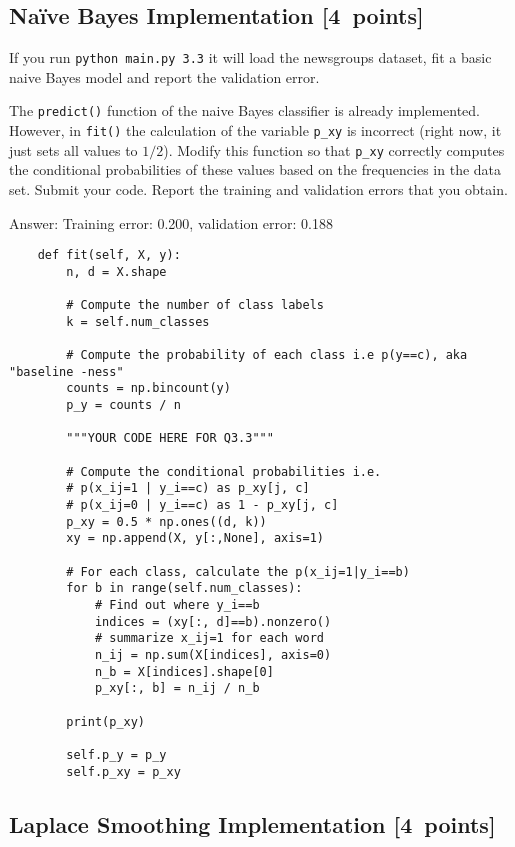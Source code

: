 \documentclass{article}
\newcommand{\blu}[1]{{\textcolor{blu}{#1}}}
\newenvironment{answer}{\par\begingroup\color{gre}Answer: }{\endgroup}
\let\ask\blu
\newcommand\pts[1]{\textcolor{pointscolour}{[#1~points]}}
\begin{document}
    \subsection{Na\"ive Bayes Implementation \pts{4}}

    If you run \texttt{python main.py 3.3}
    it will load the newsgroups dataset, fit a basic naive Bayes model and report the validation error.

    The \texttt{predict()} function of the naive Bayes classifier is already implemented.
    However, in \texttt{fit()}
    the calculation of the variable \texttt{p\_xy} is incorrect
    (right now, it just sets all values to $1/2$).
    \ask{Modify this function so that \texttt{p\_xy} correctly
        computes the conditional probabilities of these values based on the
        frequencies in the data set. Submit your code. Report the training and validation errors that you obtain.}
    \begin{answer}
        Training error: 0.200, validation error: 0.188
        \begin{verbatim}
    def fit(self, X, y):
        n, d = X.shape

        # Compute the number of class labels
        k = self.num_classes

        # Compute the probability of each class i.e p(y==c), aka "baseline -ness"
        counts = np.bincount(y)
        p_y = counts / n

        """YOUR CODE HERE FOR Q3.3"""

        # Compute the conditional probabilities i.e.
        # p(x_ij=1 | y_i==c) as p_xy[j, c]
        # p(x_ij=0 | y_i==c) as 1 - p_xy[j, c]
        p_xy = 0.5 * np.ones((d, k))
        xy = np.append(X, y[:,None], axis=1)

        # For each class, calculate the p(x_ij=1|y_i==b)
        for b in range(self.num_classes):
            # Find out where y_i==b
            indices = (xy[:, d]==b).nonzero()
            # summarize x_ij=1 for each word
            n_ij = np.sum(X[indices], axis=0)
            n_b = X[indices].shape[0]
            p_xy[:, b] = n_ij / n_b

        print(p_xy)

        self.p_y = p_y
        self.p_xy = p_xy
        \end{verbatim}
    \end{answer}
    

    \subsection{Laplace Smoothing Implementation \pts{4}}
\end{document}

